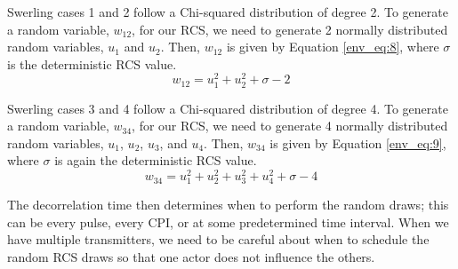Swerling cases 1 and 2 follow a Chi-squared distribution of degree 2. To generate a random variable, $w_{12}$, for our RCS, we need to generate 2 normally distributed random variables, $u_1$ and $u_2$. Then, $w_{12}$ is given by Equation \ref{env_eq:8}, where $\sigma$ is the deterministic RCS value.
\begin{equation}
  \label{env_eq:8}
w_{12} = u_1^2 + u_2^2 + \sigma - 2
  \end{equation}

Swerling cases 3 and 4 follow a Chi-squared distribution of degree 4. To generate a random variable, $w_{34}$, for our RCS, we need to generate 4 normally distributed random variables, $u_1$, $u_2$, $u_3$, and $u_4$. Then, $w_{34}$ is given by Equation \ref{env_eq:9}, where $\sigma$ is again the deterministic RCS value.
\begin{equation}
  \label{env_eq:9}
w_{34} = u_1^2 + u_2^2 + u_3^2 + u_4^2 + \sigma - 4
  \end{equation}
  
The decorrelation time then determines when to perform the random draws; this can be every pulse, every CPI, or at some predetermined time interval. When we have multiple transmitters, we need to be careful about when to schedule the random RCS draws so that one actor does not influence the others.  